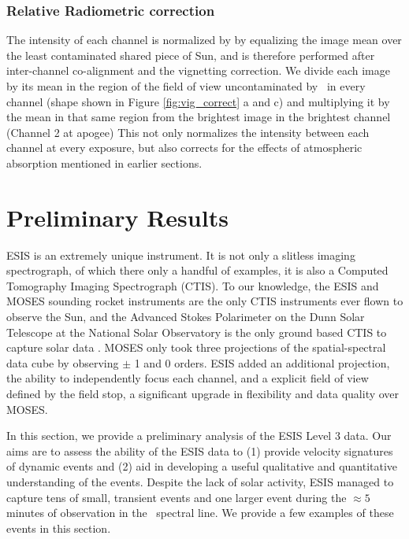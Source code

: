         

        
    \subsubsection{Relative Radiometric correction }
        The intensity of each channel is normalized by by equalizing the image mean over the least contaminated shared piece of Sun, and is therefore performed after inter-channel co-alignment and the vignetting correction.
        We divide each image by its mean in the region of the field of view uncontaminated by \mgxbright \ in every channel (shape shown in Figure \ref{fig:vig_correct} a and c) and multiplying it by the mean in that same region from the brightest image in the brightest channel (Channel 2 at apogee)
        This not only normalizes the intensity between each channel at every exposure, but also corrects for the effects of atmospheric absorption mentioned in earlier sections. 


\section{Preliminary Results}

	   ESIS is an extremely unique instrument.  It is not only a slitless imaging spectrograph, of which there only a handful of examples, it is also a Computed Tomography Imaging Spectrograph (CTIS).  
	   To our knowledge, the ESIS and MOSES sounding rocket instruments are the only CTIS instruments ever flown to observe the Sun, and  the Advanced Stokes Polarimeter on the Dunn Solar Telescope at the National Solar Observatory is the only ground based CTIS to capture solar data \citep{deforest2004}.  
	   MOSES only took three projections of the spatial-spectral data cube by observing $\pm$ 1 and 0 orders.
	   ESIS added an additional projection, the ability to independently focus each channel, and a explicit field of view defined by the field stop, a significant upgrade in flexibility and data quality over MOSES.
	   
	   In this section, we provide a preliminary analysis of the ESIS Level 3 data. Our aims are to assess the ability of the ESIS data to (1) provide velocity signatures of dynamic events and (2) aid in developing a useful qualitative and quantitative understanding of the events.
	   Despite the lack of solar activity, ESIS managed to capture tens of small, transient events and one larger event during the $\approx 5$ minutes of observation in the \ov \ spectral line.  
	   We provide a few examples of these events in this section.  
	   
